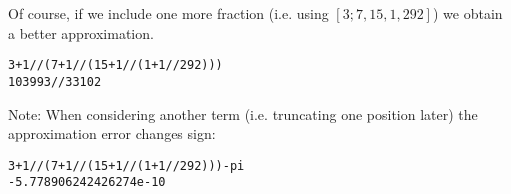 Of course, if we include one more fraction (i.e. using $[3;7,15,1,292]$) we obtain a better approximation.

\begin{verbatim}
3+1//(7+1//(15+1//(1+1//292)))
103993//33102
\end{verbatim}

Note: When considering another term (i.e. truncating one position later) the approximation error changes sign: 

\begin{verbatim}
3+1//(7+1//(15+1//(1+1//292)))-pi
-5.778906242426274e-10
\end{verbatim}